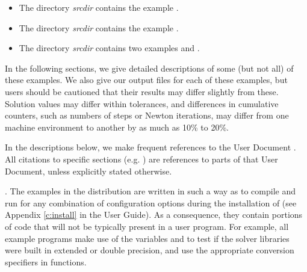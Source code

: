 \begin{itemize}

\item The directory {\em srcdir} contains
the example .

\item The directory {\em srcdir} contains
the example .

\item The directory {\em srcdir} contains
two examples  and .

\end{itemize}


\vspace{0.2in}\noindent 
In the following sections, we give detailed descriptions of some (but
not all) of these examples.  We also give our output files for
each of these examples, but users should be cautioned that their
results may differ slightly from these.  Solution
values may differ within tolerances, and differences in cumulative
counters, such as numbers of steps or Newton iterations, may differ
from one machine environment to another by as much as 10\% to 20\%.

In the descriptions below, we make frequent references to the {\ida}
User Document \cite{ida_ug}.  All citations to specific sections
(e.g. ) are references to parts of that User Document, unless
explicitly stated otherwise.

\vspace{0.2in}. 
The examples in the {\ida} distribution are written in such a way as
to compile and run for any combination of configuration options during the
installation of {\sundials} (see Appendix \ref{c:install} in the User Guide).
As a consequence, they contain portions of code that will not be typically present in a
user program. For example, all example programs make use of the
variables  and 
to test if the solver libraries were built in extended or double precision,
and use the appropriate conversion specifiers in  functions.
